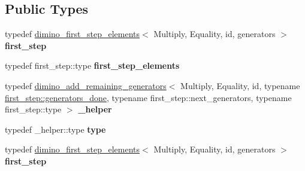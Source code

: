 \subsection*{Public Types}
\begin{DoxyCompactItemize}
\item 
\mbox{\label{struct_eigen_1_1internal_1_1group__theory_1_1enumerate__group__elements__noid_a636d9ac7ea87e8a20b0b1b08398e9d26}} 
typedef \hyperlink{struct_eigen_1_1internal_1_1group__theory_1_1dimino__first__step__elements}{dimino\+\_\+first\+\_\+step\+\_\+elements}$<$ Multiply, Equality, id, generators $>$ {\bfseries first\+\_\+step}
\item 
\mbox{\label{struct_eigen_1_1internal_1_1group__theory_1_1enumerate__group__elements__noid_ae4cf13c8f6fc01f9e4ef3325a7f60435}} 
typedef first\+\_\+step\+::type {\bfseries first\+\_\+step\+\_\+elements}
\item 
\mbox{\label{struct_eigen_1_1internal_1_1group__theory_1_1enumerate__group__elements__noid_a174551f0396f06c2185c642acedb7dfa}} 
typedef \hyperlink{struct_eigen_1_1internal_1_1group__theory_1_1dimino__add__remaining__generators}{dimino\+\_\+add\+\_\+remaining\+\_\+generators}$<$ Multiply, Equality, id, typename \hyperlink{struct_eigen_1_1internal_1_1type__list}{first\+\_\+step\+::generators\+\_\+done}, typename first\+\_\+step\+::next\+\_\+generators, typename first\+\_\+step\+::type $>$ {\bfseries \+\_\+helper}
\item 
\mbox{\label{struct_eigen_1_1internal_1_1group__theory_1_1enumerate__group__elements__noid_a81b4f08a5f43fc88459179b9bf587752}} 
typedef \+\_\+helper\+::type {\bfseries type}
\item 
\mbox{\label{struct_eigen_1_1internal_1_1group__theory_1_1enumerate__group__elements__noid_a636d9ac7ea87e8a20b0b1b08398e9d26}} 
typedef \hyperlink{struct_eigen_1_1internal_1_1group__theory_1_1dimino__first__step__elements}{dimino\+\_\+first\+\_\+step\+\_\+elements}$<$ Multiply, Equality, id, generators $>$ {\bfseries first\+\_\+step}

\end{DoxyCompactItemize}
